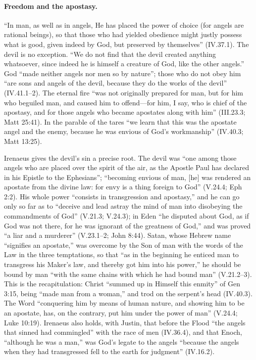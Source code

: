 \paragraph{Freedom and the apostasy.} ``In man, as well as in angels, He
has placed the power of choice (for angels are rational beings), so that
those who had yielded obedience might justly possess what is good, given
indeed by God, but preserved by themselves'' (IV.37.1). The devil is no
exception. ``We do not find that the devil created anything whatsoever,
since indeed he is himself a creature of God, like the other angels.''
God ``made neither angels nor men so by nature''; those who do not obey
him ``are sons and angels of the devil, because they do the works of the
devil'' (IV.41.1--2). The eternal fire ``was
not originally prepared for man, but for him who beguiled man, and caused
him to offend---for him, I say, who is chief of the apostasy, and for those
angels who became apostates along with him'' (III.23.3; Matt 25:41).
In the parable of the tares ``we learn that this was the apostate angel and
the enemy, because he was envious of God's workmanship'' (IV.40.3; Matt
13:25).

Irenaeus gives the devil's sin a precise root. The devil was ``one among
those angels who are placed over the spirit of the air, as the Apostle Paul
has declared in his Epistle to the Ephesians''; ``becoming envious of man,
[he] was rendered an apostate from the divine law: for envy is a thing
foreign to God'' (V.24.4; Eph 2:2). His whole power ``consists in
transgression and apostasy,'' and he can go only so far as to ``deceive and
lead astray the mind of man into disobeying the commandments of God''
(V.21.3; V.24.3); in Eden ``he disputed about God, as if God was not
there, for he was ignorant of the greatness of God,'' and was proved ``a
liar and a murderer'' (V.23.1--2; John 8:44). Satan, whose Hebrew name
``signifies an apostate,'' was overcome by the Son of man with the words
of the Law in the three temptations, so that ``as in the beginning he
enticed man to transgress his Maker's law, and thereby got him into his
power,'' he should be bound by man ``with the same chains with which he had
bound man'' (V.21.2--3). This is the recapitulation: Christ ``summed up in
Himself this enmity'' of Gen 3:15, being ``made man from a woman,'' and
trod on the serpent's head (IV.40.3). The Word ``conquering him by means of
human nature, and showing him to be an apostate, has, on the contrary, put
him under the power of man'' (V.24.4; Luke 10:19). Irenaeus also holds,
with Justin, that before the Flood ``the angels that sinned had commingled''
with the race of men (IV.36.4), and that Enoch, ``although he was a man,''
was God's legate to the angels ``because the angels when they had
transgressed fell to the earth for judgment'' (IV.16.2).

